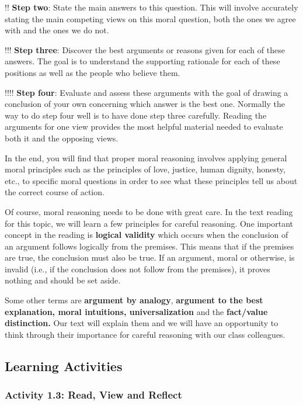 \documentclass[
]{book}
\begin{document}
!! \textbf{Step two}: State the main answers to this question. This will involve accurately stating the main competing views on this moral question, both the ones we agree with and the ones we do not.

!!! \textbf{Step three}: Discover the best arguments or reasons given for each of these answers. The goal is to understand the supporting rationale for each of these positions as well as the people who believe them.

!!!! \textbf{Step four}: Evaluate and assess these arguments with the goal of drawing a conclusion of your own concerning which answer is the best one. Normally the way to do step four well is to have done step three carefully. Reading the arguments for one view provides the most helpful material needed to evaluate both it and the opposing views.

In the end, you will find that proper moral reasoning involves applying general
moral principles such as the principles of love, justice, human dignity,
honesty, etc., to specific moral questions in order to see what these principles
tell us about the correct course of action.

Of course, moral reasoning needs to be done with great care. In the text reading
for this topic, we will learn a few principles for careful reasoning. One
important concept in the reading is \textbf{logical validity} which occurs when the
conclusion of an argument follows logically from the premises. This means that
if the premises are true, the conclusion must also be true. If an argument,
moral or otherwise, is invalid (i.e., if the conclusion does not follow from the
premises), it proves nothing and should be set aside.

Some other terms are \textbf{argument by analogy}, \textbf{argument to the best
explanation, moral intuitions, universalization} and the \textbf{fact/value
distinction.} Our text will explain them and we will have an opportunity to
think through their importance for careful reasoning with our class colleagues.

\hypertarget{learning-activities-5}{%
\subsection{Learning Activities}\label{learning-activities-5}}

\hypertarget{activity-1.3-read-view-and-reflect-1}{%
\subsubsection{Activity 1.3: Read, View and Reflect}\label{activity-1.3-read-view-and-reflect-1}}
\end{document}
